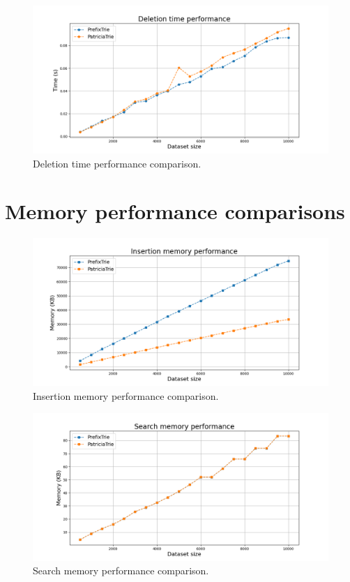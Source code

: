 \documentclass[essay]{fer}
\begin{document}
\begin{figure}[H]
  \centering
  \includegraphics[width=1.00\textwidth]{Figures/deletion_time_performance.png}
  \caption{Deletion time performance comparison.}
  \label{fig:deletion_time}
\end{figure}


\section{Memory performance comparisons}

\begin{figure}[H]
  \centering
  \includegraphics[width=1.00\textwidth]{Figures/insertion_memory_performance.png}
  \caption{Insertion memory performance comparison.}
  \label{fig:insertion_memory}
\end{figure}

\begin{figure}[H]
  \centering
  \includegraphics[width=1.00\textwidth]{Figures/search_memory_performance.png}
  \caption{Search memory performance comparison.}
  \label{fig:search_memory}
\end{figure}
\end{document}
